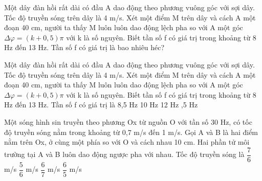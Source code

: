 \begin{ex}%
Một dây đàn hồi rất dài có đầu A dao động theo phương vuông góc với sợi dây. Tốc độ truyền sóng trên dây là 4 m/s. Xét một điểm M trên dây và cách A một đoạn 40 cm, người ta thấy M luôn luôn dao động lệch pha so với A một góc $\Delta \varphi=(k + 0,5)\pi$ với k là số nguyên. Biết tần số f có giá trị trong khoảng từ 8 Hz đến 13 Hz.  Tần số f có giá trị là bao nhiêu héc?
\end{ex} 
\begin{ex}%
Một dây đàn hồi rất dài có đầu A dao động theo phương vuông góc với sợi dây. Tốc độ truyền sóng trên dây là 4 m/s. Xét một điểm M trên dây và cách A một đoạn 40 cm, người ta thấy M luôn luôn dao động lệch pha so với A một góc $\Delta \varphi=(k + 0,5)\pi$ với k là số nguyên. Biết tần số f có giá trị trong khoảng từ 8 Hz đến 13 Hz.  Tần số f có giá trị là
\choice
{8,5 Hz}
{10 Hz}
{12 Hz}
{,5 Hz}
\end{ex} 
\begin{ex}%
Một sóng hình sin truyền theo phương Ox từ nguồn O với tần số 30 Hz, có tốc độ truyền sóng nằm trong khoảng từ 0,7 m/s đến 1 m/s. Gọi A và B là hai điểm nằm trên Ox, ở cùng một phía so với O và cách nhau 10 cm. Hai phần tử môi trường tại A và B luôn dao động ngược pha với nhau. Tốc độ truyền sóng là
\choice
{$\dfrac{7}{6}$ m/s}
{$\dfrac{5}{6}$ m/s}
{\True $\dfrac{6}{7}$ m/s}
{$\dfrac{6}{5}$ m/s}
\end{ex} 
